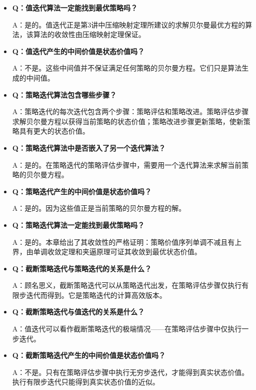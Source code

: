 \documentclass[UTF8]{article}
\begin{document}
\begin{itemize}
    \item \textbf{Q：值迭代算法一定能找到最优策略吗？}

    A：是的。值迭代正是第3讲中压缩映射定理所建议的求解贝尔曼最优方程的算法，该算法的收敛性由压缩映射定理保证。

    \item \textbf{Q：值迭代产生的中间价值是状态价值吗？}

    A：不是。这些中间值并不保证满足任何策略的贝尔曼方程。它们只是算法生成的中间值。

    \item \textbf{Q：策略迭代算法包含哪些步骤？}

    A：策略迭代的每次迭代包含两个步骤：策略评估和策略改进。策略评估步骤求解贝尔曼方程以获得当前策略的状态价值；策略改进步骤更新策略，使新策略具有更大的状态价值。

    \item \textbf{Q：策略迭代算法中是否嵌入了另一个迭代算法？}

    A：是的。在策略迭代的策略评估步骤中，需要用一个迭代算法来求解当前策略的贝尔曼方程。

    \item \textbf{Q：策略迭代产生的中间价值是状态价值吗？}

    A：是的。因为这些值正是当前策略的贝尔曼方程的解。

    \item \textbf{Q：策略迭代算法一定能找到最优策略吗？}

    A：是的。本章给出了其收敛性的严格证明：策略价值序列单调不减且有上界，由单调收敛定理和夹逼原理可证其收敛到最优状态价值。

    \item \textbf{Q：截断策略迭代与策略迭代的关系是什么？}

    A：顾名思义，截断策略迭代可以从策略迭代出发，在策略评估步骤仅执行有限步迭代而得到。它是策略迭代的计算高效版本。

    \item \textbf{Q：截断策略迭代与值迭代的关系是什么？}

    A：值迭代可以看作截断策略迭代的极端情况——在策略评估步骤中仅执行一步迭代。

    \item \textbf{Q：截断策略迭代产生的中间价值是状态价值吗？}

    A：不是。只有在策略评估步骤中执行无穷步迭代，才能得到真实状态价值。执行有限步迭代只能得到真实状态价值的近似。


\end{itemize}
\end{document}
